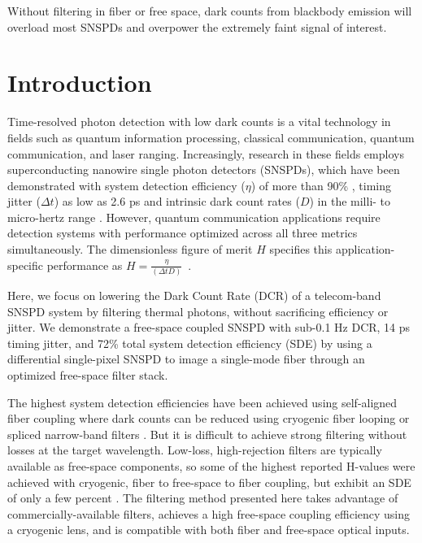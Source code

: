 \documentclass[11pt]{caltech_thesis} %
\begin{document}
Without filtering in fiber or free space, dark counts from blackbody emission will overload most SNSPDs and overpower the extremely faint signal of interest.

\hypertarget{introduction-1}{%
\section{Introduction}\label{introduction-1}}

Time-resolved photon detection with low dark counts is a vital technology in fields such as quantum information processing, classical communication, quantum communication, and laser ranging. Increasingly, research in these fields employs superconducting nanowire single photon detectors (SNSPDs), which have been demonstrated with system detection efficiency ($\eta$) of more than 90\% \autocite{Reddy2020}, timing jitter ($\Delta t$) as low as 2.6 ps \autocite{Korzh2020} and intrinsic dark count rates ($D$) in the milli- to micro-hertz range \autocite{Hochberg2019}. However, quantum communication applications require detection systems with performance optimized across all three metrics simultaneously. The dimensionless figure of merit $H$ specifies this application-specific performance as $H = \frac{\eta}{(\Delta t D)}$~\autocite{Hadfield2009}.

Here, we focus on lowering the Dark Count Rate (DCR) of a telecom-band SNSPD system by filtering thermal photons, without sacrificing efficiency or jitter. We demonstrate a free-space coupled SNSPD with sub-0.1 Hz DCR, 14 ps timing jitter, and 72\% total system detection efficiency (SDE) by using a differential single-pixel SNSPD \autocite{Colangelo2021} to image a single-mode fiber through an optimized free-space filter stack.

The highest system detection efficiencies have been achieved using self-aligned fiber coupling where dark counts can be reduced using cryogenic fiber looping \autocite{Cohen2015} or spliced narrow-band filters \autocite{Boaron2018secure}. But it is difficult to achieve strong filtering without losses at the target wavelength. Low-loss, high-rejection filters are typically available as free-space components, so some of the highest reported H-values were achieved with cryogenic, fiber to free-space to fiber coupling, but exhibit an SDE of only a few percent \autocite{Shibata2015}. The filtering method presented here takes advantage of commercially-available filters, achieves a high free-space coupling efficiency using a cryogenic lens, and is compatible with both fiber and free-space optical inputs.
\end{document}
